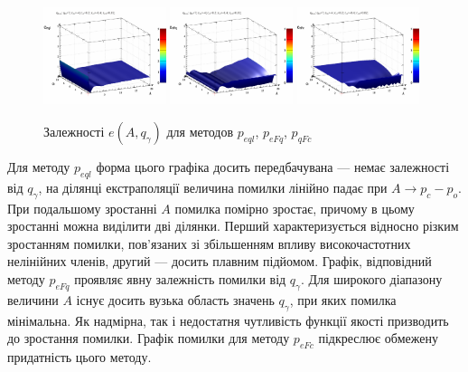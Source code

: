 \documentclass[a4paper,13pt]{atuaref}
\begin{document}
\begin{figure}[htb!]
  \centerline{
    \includegraphics[width=0.32\textwidth]{p3/p/qls_pe-p_A_qg_eql_all.png}
    \hfill
    \includegraphics[width=0.32\textwidth]{p3/p/qls_pe-p_A_qg_eFq_all.png}
    \hfill
    \includegraphics[width=0.32\textwidth]{p3/p/qls_pe-p_A_qg_eFc_all.png}
  }
  \caption{Залежності $e(A,q_\gamma)$ для методов $p_{eql}$, $p_{eFq}$, $p_{qFc}$}
  \label{atu:f:qsl_pe_A_qg_all}
\end{figure}

Для методу $ p_{eql} $ форма цього графіка досить передбачувана --- немає
залежності від $ q_\gamma $, на ділянці екстраполяції величина помилки
лінійно падає при $ A \to p_c - p_o $. При подальшому зростанні $ A $ помилка
помірно зростає, причому в цьому зростанні можна виділити дві ділянки. Перший
характеризується відносно різким зростанням помилки, пов'язаних зі збільшенням
впливу високочастотних нелінійних членів, другий --- досить плавним підйомом.
Графік, відповідний методу $ p_{eFq} $ проявляє явну залежність помилки від
$q_\gamma$. Для широкого діапазону величини $ A $ існує досить вузька область
значень $ q_\gamma $, при яких помилка мінімальна. Як надмірна, так і
недостатня чутливість функції якості призводить до зростання помилки.
Графік помилки для методу $ p_{eFc} $ підкреслює обмежену придатність цього методу.
\end{document}
